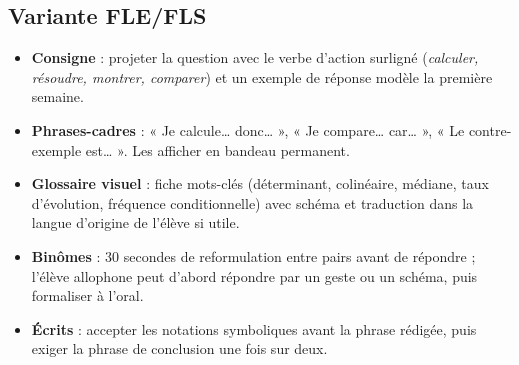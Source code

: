 \subsection*{Variante FLE/FLS}
\begin{itemize}[leftmargin=1.2em,itemsep=2pt]
  \item \textbf{Consigne} : projeter la question avec le verbe d'action surligné (\emph{calculer, résoudre, montrer, comparer}) et un exemple de réponse modèle la première semaine.
  \item \textbf{Phrases-cadres} : « Je calcule\ldots{} donc\ldots{} », « Je compare\ldots{} car\ldots{} », « Le contre-exemple est\ldots{} ». Les afficher en bandeau permanent.
  \item \textbf{Glossaire visuel} : fiche mots-clés (déterminant, colinéaire, médiane, taux d'évolution, fréquence conditionnelle) avec schéma et traduction dans la langue d'origine de l'élève si utile.
  \item \textbf{Binômes} : 30 secondes de reformulation entre pairs avant de répondre ; l'élève allophone peut d'abord répondre par un geste ou un schéma, puis formaliser à l'oral.
  \item \textbf{Écrits} : accepter les notations symboliques avant la phrase rédigée, puis exiger la phrase de conclusion une fois sur deux.
\end{itemize}

